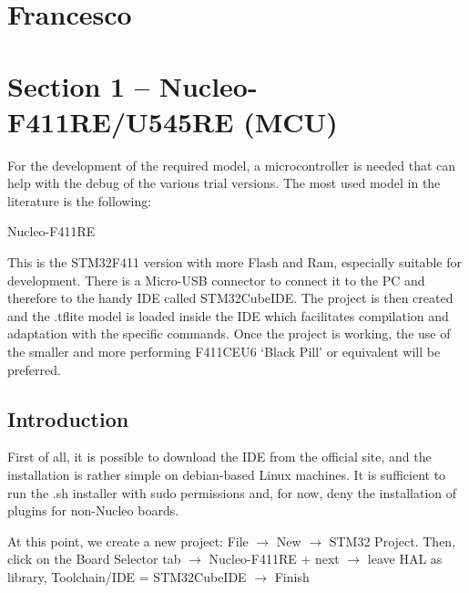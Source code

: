 \section{Francesco}\label{sec:francesco}


\newenvironment{cverbatim}
  {\begin{center}\begin{minipage}{0.7\linewidth}\begin{verbatim}}
  {\end{verbatim}\end{minipage}\end{center}}

\nocite{*}
\section{Section 1 -- Nucleo-F411RE/U545RE (MCU)}


For the development of the required model, a microcontroller is needed that can help with the debug of the various trial versions. The most used model in the literature is the following:
\begin{center}
    Nucleo-F411RE
\end{center}
This is the STM32F411 version with more Flash and Ram, especially suitable for development. There is a Micro-USB connector to connect it to the PC and therefore to the handy IDE called STM32CubeIDE. The project is then created and the .tflite model is loaded inside the IDE which facilitates compilation and adaptation with the specific commands. Once the project is working, the use of the smaller and more performing F411CEU6 ‘Black Pill’ or equivalent will be preferred.

\subsection{Introduction}

First of all, it is possible to download the IDE from the official site, and the installation is rather simple on debian-based Linux machines. It is sufficient to run the .sh installer with sudo permissions and, for now, deny the installation of plugins for non-Nucleo boards.

At this point, we create a new project: File $\rightarrow$ New $\rightarrow$ STM32 Project. Then, click on the Board Selector tab $\rightarrow$ Nucleo-F411RE + next $\rightarrow$ leave HAL as library, Toolchain/IDE = STM32CubeIDE $\rightarrow$ Finish

